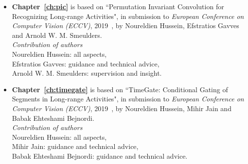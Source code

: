 \begin{itemize}
\item
\textbf{Chapter~\ref{ch:pic}} is based on ``Permutation Invariant Convolution for Recognizing Long-range Activities", in submission to \textit{European Conference on Computer Vision (ECCV)}, 2019~\cite{hussein2017unified}, by Noureldien Hussein, Efstratios Gavves and Arnold W. M. Smeulders.
\vspace*{5pt}
\\
\textit{Contribution of authors}
\vspace*{5pt}
\\
Noureldien Hussein: all aspects,\\
Efstratios Gavves: guidance and technical advice,\\
Arnold W. M. Smeulders: supervision and insight.

\item
\textbf{Chapter~\ref{ch:timegate}} is based on ``TimeGate: Conditional Gating of Segments in Long-range Activities", in submission to \textit{European Conference on Computer Vision (ECCV)}, 2019~\cite{hussein2017unified}, by Noureldien Hussein, Mihir Jain and Babak Ehteshami Bejnordi.
\vspace*{5pt}
\\
\textit{Contribution of authors}
\vspace*{5pt}
\\
Noureldien Hussein: all aspects,\\
Mihir Jain: guidance and technical advice,\\
Babak Ehteshami Bejnordi: guidance and technical advice.

\end{itemize}